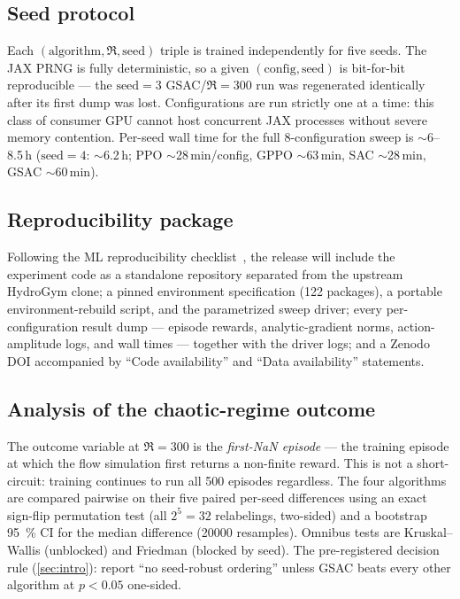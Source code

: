 \subsection{Seed protocol}
\label{sec:seedprotocol}

Each $(\text{algorithm},\Re,\text{seed})$ triple is trained independently for
five seeds. The JAX PRNG is fully deterministic, so a given
$(\text{config},\text{seed})$ is bit-for-bit reproducible --- the
$\text{seed}=3$ GSAC/$\Re=300$ run was regenerated identically after its first
dump was lost. Configurations are run strictly one at a time: this class of
consumer GPU cannot host concurrent JAX processes without severe memory
contention. Per-seed wall time for the full 8-configuration sweep is
$\sim$6--8.5\,h ($\text{seed}=4$: $\sim$6.2\,h; PPO $\sim$28\,min/config,
GPPO $\sim$63\,min, SAC $\sim$28\,min, GSAC $\sim$60\,min).

\subsection{Reproducibility package}

Following the ML reproducibility checklist~\cite{pineau2021}, the release
will include the experiment code as a standalone repository separated from
the upstream HydroGym clone; a pinned environment specification (122
packages), a portable environment-rebuild script, and the parametrized sweep
driver; every per-configuration result dump --- episode rewards,
analytic-gradient norms, action-amplitude logs, and wall times --- together
with the driver logs; and a Zenodo DOI accompanied by ``Code availability''
and ``Data availability'' statements.

\subsection{Analysis of the chaotic-regime outcome}
\label{sec:analysisplan}

The outcome variable at $\Re=300$ is the \emph{first-NaN episode} --- the
training episode at which the flow simulation first returns a non-finite
reward. This is not a short-circuit: training continues to run all 500
episodes regardless. The four algorithms are compared pairwise on their five
paired per-seed differences using an exact sign-flip permutation
test (all $2^5=32$ relabelings, two-sided) and a bootstrap
\SI{95}{\percent} CI for the median difference (\num{20000} resamples).
Omnibus tests are Kruskal--Wallis (unblocked) and Friedman (blocked by
seed). The pre-registered decision rule (\cref{sec:intro}): report ``no
seed-robust ordering'' unless GSAC beats every other algorithm at
$p<0.05$ one-sided.

